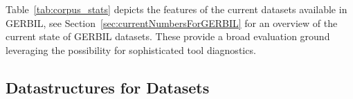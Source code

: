 Table~\ref{tab:corpus_stats} depicts the features of the current datasets available in GERBIL, see Section~\ref{sec:currentNumbersForGERBIL} for an overview of the current state of GERBIL datasets.
These provide a broad evaluation ground leveraging the possibility for sophisticated tool diagnostics.






\subsection{Datastructures for Datasets}
\label{cha334:sec:datastructures}

